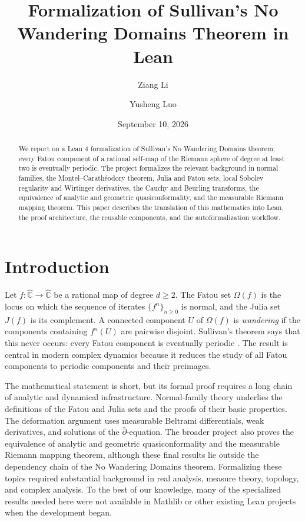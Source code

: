 \documentclass[letterpaper]{amsart}
\title[No Wandering Domains in Lean]{Formalization of Sullivan's No Wandering Domains Theorem in Lean}
\author{Ziang Li}
\author{Yusheng Luo}
\date{September 10, 2026}
\numberwithin{equation}{section}
\numberwithin{figure}{section}
\theoremstyle{plain}
\theoremstyle{definition}
\newcommand{\Sphere}{\widehat{\mathbb{C}}}
\begin{document}
\begin{abstract}
We report on a Lean 4 formalization of Sullivan's No Wandering Domains theorem: every Fatou component of a rational self-map of the Riemann sphere of degree at least two is eventually periodic. The project formalizes the relevant background in normal families, the Montel--Carath\'eodory theorem, Julia and Fatou sets, local Sobolev regularity and Wirtinger derivatives, the Cauchy and Beurling transforms, the equivalence of analytic and geometric quasiconformality, and the measurable Riemann mapping theorem. This paper describes the translation of this mathematics into Lean, the proof architecture, the reusable components, and the autoformalization workflow.
\end{abstract}

\maketitle

\section{Introduction}

Let $f\colon \Sphere\to\Sphere$ be a rational map of degree $d\geq 2$. The Fatou set $\Omega(f)$ is the locus on which the sequence of iterates $\{f^n\}_{n\geq 0}$ is normal, and the Julia set $J(f)$ is its complement. A connected component $U$ of $\Omega(f)$ is \emph{wandering} if the components containing $f^n(U)$ are pairwise disjoint. Sullivan's theorem says that this never occurs: every Fatou component is eventually periodic \cite{Sullivan}. The result is central in modern complex dynamics because it reduces the study of all Fatou components to periodic components and their preimages.

The mathematical statement is short, but its formal proof requires a long chain of analytic and dynamical infrastructure. Normal-family theory underlies the definitions of the Fatou and Julia sets and the proofs of their basic properties. The deformation argument uses measurable Beltrami differentials, weak derivatives, and solutions of the $\bar\partial$-equation. The broader project also proves the equivalence of analytic and geometric quasiconformality and the measurable Riemann mapping theorem, although these final results lie outside the dependency chain of the No Wandering Domains theorem. Formalizing these topics required substantial background in real analysis, measure theory, topology, and complex analysis. To the best of our knowledge, many of the specialized results needed here were not available in Mathlib or other existing Lean projects when the development began.
\end{document}
